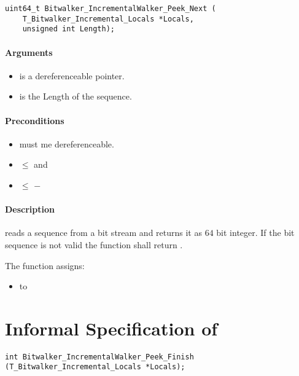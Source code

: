 \begin{lstlisting}[style=acsl-block]
uint64_t Bitwalker_IncrementalWalker_Peek_Next (
    T_Bitwalker_Incremental_Locals *Locals,
    unsigned int Length);
\end{lstlisting}


\paragraph{Arguments}
\begin{itemize}
   \item  {} is a dereferenceable pointer.
   \item {} is the Length of the sequence.
\end{itemize}

\paragraph{Preconditions}
\begin{itemize}
    \item  {} must me dereferenceable.
    \item {} $\leq$  and
    \item {} $\leq $  $-$ 
\end{itemize}

\paragraph{Description}

\peeknext reads a sequence from a bit stream and  returns it as $64$ bit integer. If the bit sequence is not valid the function shall return .

The function assigns:

\begin{itemize}
    \item {} to 
\end{itemize}

\clearpage

\section{Informal Specification of }

\begin{lstlisting}[style=acsl-block]
int Bitwalker_IncrementalWalker_Peek_Finish (T_Bitwalker_Incremental_Locals *Locals);
\end{lstlisting}

